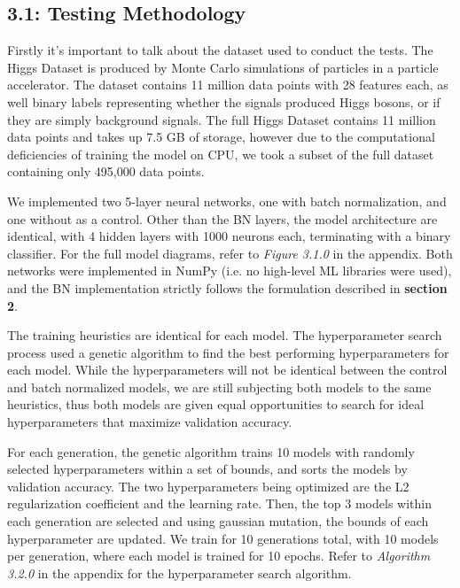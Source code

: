 \documentclass{article}
\begin{document}
\begin{multicols*}{2}
\subsection*{3.1: Testing Methodology}

Firstly it's important to talk about the dataset used to conduct the tests.
The Higgs Dataset\cite{higgs} is produced 
by Monte Carlo simulations of particles in a particle accelerator. The 
dataset contains 11 million data points with 28 features each, as well
 binary labels representing whether the signals produced Higgs bosons, or 
if they are simply background signals. The full Higgs Dataset contains 11 million 
data points and takes up 7.5 GB of storage, however due to the computational 
deficiencies of training the model on CPU, we took a subset of the full dataset
containing only 495,000 data points.

We implemented two 5-layer neural networks, one with batch normalization, and 
one without as a control. Other than the BN layers, the model architecture are
identical, with 4 hidden layers with 1000 neurons each, terminating with a 
binary classifier. For the full model diagrams, refer to \textit{Figure 3.1.0} 
in the appendix. Both networks were implemented in NumPy (i.e. no high-level 
ML libraries were used), and the BN implementation
strictly follows the formulation described in \textbf{section 2}.

The training heuristics are identical for each model. The hyperparameter search process used 
a genetic algorithm\cite{genetic} to find the best performing 
hyperparameters for each model. While the hyperparameters will not be identical
between the control and batch normalized models, we are still subjecting both
models to the same heuristics, thus both models are given equal opportunities 
to search for ideal hyperparameters that maximize validation accuracy.

For each generation, the genetic algorithm trains 10 models with randomly 
selected hyperparameters within a set of bounds, and sorts the models
by validation accuracy. The two hyperparameters being optimized are the 
L2 regularization coefficient and the learning rate. Then, the top 3 models
within each generation are selected and using gaussian mutation\cite{gm}, the bounds of each hyperparameter 
are updated. We train for 10 generations total, with 10 models per generation, 
where each model is trained for 10 epochs. Refer to \textit{Algorithm 3.2.0}
in the appendix for the hyperparameter search algorithm.


\end{multicols*}
\end{document}

